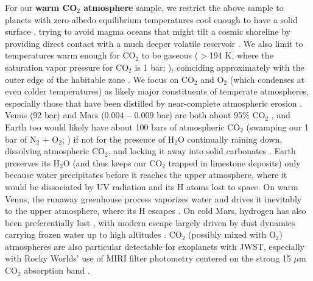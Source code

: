 \documentclass[modern,linenumbers,trackchanges]{aastex7}
\begin{document}


For our {\bf warm CO$_2$ atmosphere} sample, we restrict the above sample to planets with zero-albedo equilibrium temperatures cool enough to have a solid surface \citep[$< 1700\mathrm{K}$;][]{boukareDeepTwophaseHemispherical2022}, trying to avoid magma oceans that might tilt a cosmic shoreline by providing direct contact with a much deeper volatile reservoir \citep[see][]{huSecondaryAtmosphereRocky2024}. We also limit to temperatures warm enough for CO$_2$ to be gaseous ($>$194 K, where the saturation vapor pressure for CO$_2$ is 1 bar; \citealt{pierrehumbertPrinciplesPlanetaryClimate2010}), coinciding approximately with the outer edge of the habitable zone \citep[where CO$_2$ can no longer provide greenhouse warming because it condenses out of the atmosphere;][]{kopparapuHabitableZonesMainsequence2013}. We focus on CO$_2$ and O$_2$ (which condenses at even colder temperatures) as likely major constituents of temperate atmospheres, especially those that have been distilled by near-complete atmospheric erosion \citep{hamanoEmergenceTwoTypes2013a, lugerExtremeWaterLoss2015, schaeferPredictionsAtmosphericComposition2016c,  krissansen-tottonErosionLargePrimary2024}. Venus (92 bar) and Mars ($0.004-0.009$ bar) are both about 95\% CO$_2$ \citep{loddersPlanetaryScientistsCompanion1998}, and Earth too would likely have about 100 bars of atmospheric CO$_2$ (swamping our 1 bar of N$_2$ + O$_2$; \citealt{ingersollPlanetaryClimates2013}) if not for the presence of H$_2$O continually raining down, dissolving atmospheric CO$_2$, and locking it away into solid carbonates \citep{walkerNegativeFeedbackMechanism1981, lecuyerComparisonCarbonNitrogen2000, wordsworthAtmospheresRockyExoplanets2022, hansenDetectingAtmosphericCO22025}. Earth preserves its H$_2$O (and thus keeps our CO$_2$ trapped in limestone deposits) only because water precipitates before it reaches the upper atmosphere, where it would be dissociated by UV radiation and its H atoms lost to space. On warm Venus, the runaway greenhouse process \citep{komabayasi1ChengFen2XiangXinoDaQiQuantoShuiQuanwoYousuruJiaXiangDenaHuoXinggaYiDingnoTaiYangGuangXiadetoriuruBuLianSoknaPingHengWenDunituite1ChengFen2XiangXinoDaQiQuantoShuiQuanwoYousuruJiaXiangDenaHuoXinggaYiDingnoTaiYangGuangXiadetoriuruBuLianSoknaPingHengWenDunituiteDiscreteEquilibriumTemperatures1967, ingersollRunawayGreenhouseHistory1969} vaporizes water and drives it inevitably to the upper atmosphere, where its H escapes \citep{hamanoEmergenceTwoTypes2013a, leconteIncreasedInsolationThreshold2013, wordsworthWaterLossTerrestrial2013}. On cold Mars, hydrogen has also been preferentially lost \citep{jakoskyLossMartianAtmosphere2018}, with modern escape largely driven by dust dynamics carrying frozen water up to high altitudes \citep{chaffinMartianWaterLoss2021}. CO$_2$ (possibly mixed with O$_2$) atmospheres are also particular detectable for exoplanets with JWST, especially with Rocky Worlds' use of MIRI filter photometry centered on the strong 15 $\mu$m CO$_2$ absorption band \citep{morleyObservingAtmospheresKnown2017b, ihConstrainingThicknessTRAPPIST12023}. 
\end{document}
